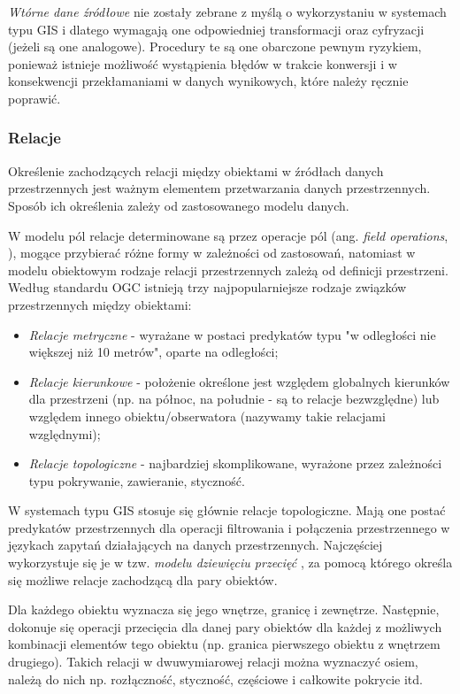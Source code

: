 \documentclass[12pt]{article}
\begin{document}
\textit{Wtórne dane źródłowe} nie zostały zebrane z myślą o wykorzystaniu w systemach typu GIS i dlatego wymagają one odpowiedniej transformacji oraz cyfryzacji (jeżeli są one analogowe). Procedury te są one obarczone pewnym ryzykiem, ponieważ istnieje możliwość wystąpienia błędów w trakcie konwersji i w konsekwencji przekłamaniami w danych wynikowych, które należy ręcznie poprawić.

\subsubsection{Relacje}

Określenie zachodzących relacji między obiektami w źródłach danych przestrzennych jest ważnym elementem przetwarzania danych przestrzennych. Sposób ich określenia zależy od zastosowanego modelu danych.

W modelu pól relacje determinowane są przez operacje pól (ang. \textit{field operations}, \cite{fieldmodel}), mogące przybierać różne formy w zależności od zastosowań, natomiast w modelu obiektowym rodzaje relacji przestrzennych zależą od definicji przestrzeni. Według standardu OGC istnieją trzy najpopularniejsze rodzaje związków przestrzennych między obiektami:

\begin{itemize}
\item \textit{Relacje metryczne} - wyrażane w postaci predykatów typu "w odległości nie większej niż 10 metrów", oparte na odległości;
\item \textit{Relacje kierunkowe} - położenie określone jest względem globalnych kierunków dla przestrzeni (np. na północ, na południe - są to relacje bezwzględne) lub względem innego obiektu/obserwatora (nazywamy takie relacjami względnymi);
\item \textit{Relacje topologiczne} - najbardziej skomplikowane, wyrażone przez zależności typu pokrywanie, zawieranie, styczność.
\end{itemize}

W systemach typu GIS stosuje się głównie relacje topologiczne. Mają one postać predykatów przestrzennych dla operacji filtrowania i połączenia przestrzennego w językach zapytań działających na danych przestrzennych. Najczęściej wykorzystuje się je w tzw. \textit{modelu dziewięciu przecięć} \cite{9sec}, za pomocą którego określa się możliwe relacje zachodzącą dla pary obiektów.

Dla każdego obiektu wyznacza się jego wnętrze, granicę i zewnętrze. Następnie, dokonuje się operacji przecięcia dla danej pary obiektów dla każdej z możliwych kombinacji elementów tego obiektu (np. granica pierwszego obiektu z wnętrzem drugiego). Takich relacji w dwuwymiarowej relacji można wyznaczyć osiem, należą do nich np. rozłączność, styczność, częściowe i całkowite pokrycie itd. 
\end{document}
